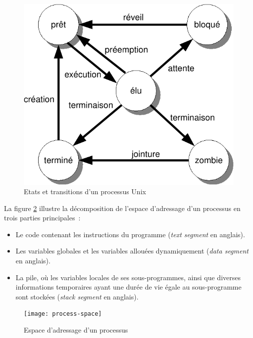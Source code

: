 \begin{figure}[ht]
  \begin{center}
    \includegraphics{images/process-state-unix}
    \caption{\label{fig:process-state-unix}Etats et transitions d'un processus Unix}
  \end{center}
\end{figure}

La figure \ref{fig:process-space} illustre la décomposition de l'espace d'adressage d'un processus en trois parties principales~:
\begin{itemize}
\item Le code contenant les instructions du programme (\emph{text segment} en anglais).
\item Les variables globales et les variables allouées dynamiquement (\emph{data segment} en anglais).
\item La pile, où les variables locales de ses sous-programmes, ainsi que diverses informations temporaires ayant une durée de vie égale au sous-programme sont stockées (\emph{stack segment} en anglais).
\end{itemize}

\begin{figure}[ht]
  \begin{center}
    \texttt{[image: process-space]}
    \caption{\label{fig:process-space}Espace d'adressage d'un processus}
  \end{center}
\end{figure}


